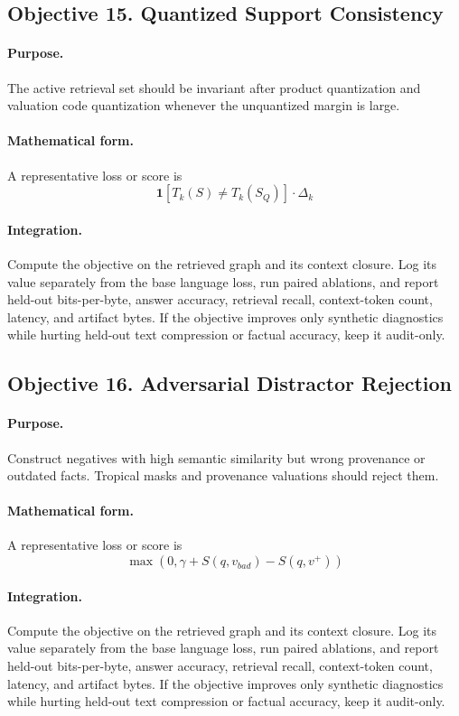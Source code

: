 \documentclass[11pt]{article}
\theoremstyle{definition}
\theoremstyle{remark}
\begin{document}
\subsection{Objective 15. Quantized Support Consistency}
\paragraph{Purpose.} The active retrieval set should be invariant after product quantization and valuation code quantization whenever the unquantized margin is large.

\paragraph{Mathematical form.} A representative loss or score is
\[
    \mathbf 1[T_k(S)\ne T_k(S_Q)]\cdot \Delta_k
\]

\paragraph{Integration.} Compute the objective on the retrieved graph and its context closure. Log its value separately from the base language loss, run paired ablations, and report held-out bits-per-byte, answer accuracy, retrieval recall, context-token count, latency, and artifact bytes. If the objective improves only synthetic diagnostics while hurting held-out text compression or factual accuracy, keep it audit-only.


\subsection{Objective 16. Adversarial Distractor Rejection}
\paragraph{Purpose.} Construct negatives with high semantic similarity but wrong provenance or outdated facts. Tropical masks and provenance valuations should reject them.

\paragraph{Mathematical form.} A representative loss or score is
\[
    \max(0,\gamma+S(q,v_{bad})-S(q,v^+))
\]

\paragraph{Integration.} Compute the objective on the retrieved graph and its context closure. Log its value separately from the base language loss, run paired ablations, and report held-out bits-per-byte, answer accuracy, retrieval recall, context-token count, latency, and artifact bytes. If the objective improves only synthetic diagnostics while hurting held-out text compression or factual accuracy, keep it audit-only.
\end{document}
